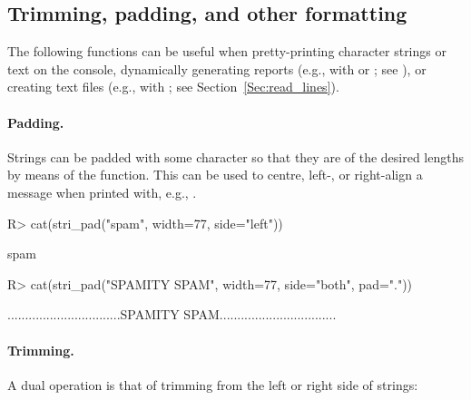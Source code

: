 \documentclass[nojss]{jss}
\begin{document}



\subsection{Trimming, padding, and other formatting}

The following functions can be useful when pretty-printing
character strings or text on the console,
dynamically generating reports (e.g.,
with  or ; see \citealp{knitr}), or creating text files
(e.g., with ; see Section~\ref{Sec:read_lines}).



\paragraph{Padding.}
Strings can be padded with some character so that they are of the desired
lengths by means of the  function.
This can be used to centre, left-, or right-align a message
when printed with, e.g.,  .


\begin{Schunk}
\begin{Sinput}
R> cat(stri_pad("spam", width=77, side="left"))
\end{Sinput}
\begin{Soutput}
                                                                         spam
\end{Soutput}
\begin{Sinput}
R> cat(stri_pad("SPAMITY SPAM", width=77, side="both", pad="."))
\end{Sinput}
\begin{Soutput}
................................SPAMITY SPAM.................................
\end{Soutput}
\end{Schunk}







\paragraph{Trimming.}
A dual operation is that of trimming from the left or right side
of strings:
\end{document}
